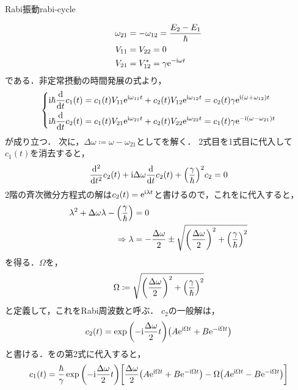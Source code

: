 \documentclass{report}
\begin{document}
\begin{myex}{Rabi振動}{rabi-cycle}
\begin{enumerate}
\begin{align}
          \omega_{21} &= -\omega_{12} = \frac{E_2 - E_1}{\hbar} \\ 
          V_{11} &= V_{22} = 0 \\ 
          V_{21} &= V_{12}^* = \gamma\mathrm{e}^{-\mathrm{i}\omega t}
        \end{align}
        である．非定常摂動の時間発展の式より，
        \begin{align}
          \begin{dcases}
            \mathrm{i}\hbar\dv{t}c_1(t) = c_1(t)V_{11}\mathrm{e}^{\mathrm{i}\omega_{11}t} + c_2(t)V_{12}\mathrm{e}^{\mathrm{i}\omega_{12}t} = c_2(t)\gamma\mathrm{e}^{\mathrm{i}\qty(\omega + \omega_{12}) t} \label{rabi-cnt-eq}\\ 
            \mathrm{i}\hbar\dv{t}c_2(t) = c_1(t)V_{21}\mathrm{e}^{\mathrm{i}\omega_{21}t} + c_2(t)V_{22}\mathrm{e}^{\mathrm{i}\omega_{22}t} = c_1(t)\gamma\mathrm{e}^{-\mathrm{i}\qty(\omega - \omega_{21}) t} 
          \end{dcases}
        \end{align}
        が成り立つ．
        次に，$\Delta\omega \coloneqq \omega - \omega_{21}$としてを解く．
        2式目を1式目に代入して$c_1(t)$を消去すると，
        \begin{align}
          \dv[2]{t}c_2(t) + \mathrm{i}\Delta\omega\dv{t}c_2(t) + \qty(\frac{\gamma}{\hbar})^2c_2 = 0\label{rabi-cnt-eq-c2}
        \end{align}
        2階の斉次微分方程式の解は$c_2(t) = \mathrm{e}^{\mathrm{i}\lambda t}$と書けるので，これをに代入すると，
        \begin{align}
          \lambda^2 + \Delta\omega\lambda - \qty(\frac{\gamma}{\hbar}) &= 0 \\
          \Rightarrow \lambda &= -\frac{\Delta\omega}{2}\pm\sqrt{\qty(\frac{\Delta\omega}{2})^2 + \qty(\frac{\gamma}{\hbar})^2}
        \end{align} 
        を得る．$\Omega$を，
        \begin{align}
          \Omega \coloneqq \sqrt{\qty(\frac{\Delta\omega}{2})^2 + \qty(\frac{\gamma}{\hbar})^2}\label{rabi-freq}
        \end{align}
        と定義して，これをRabi周波数と呼ぶ．
        $c_2$の一般解は，
        \begin{align}
          c_2(t) = \exp\qty(-\mathrm{i}\frac{\Delta\omega}{2}t)\qty(A\mathrm{e}^{\mathrm{i}\Omega t} + B\mathrm{e}^{-\mathrm{i}\Omega t})\label{c2t-general-solution}
        \end{align}
        と書ける．をの第2式に代入すると，
        \begin{align}
          c_1(t) = \frac{\hbar}{\gamma}\exp\qty(-\i\frac{\Delta\omega}{2}t)\qty[\frac{\Delta\omega}{2}\qty(A\e^{\i\Omega t} + B\e^{-\i\Omega t}) - \Omega\qty(A\e^{\i\Omega t} - B\e^{-\i\Omega t})]

\end{align}
\end{enumerate}
\end{myex}
\end{document}
